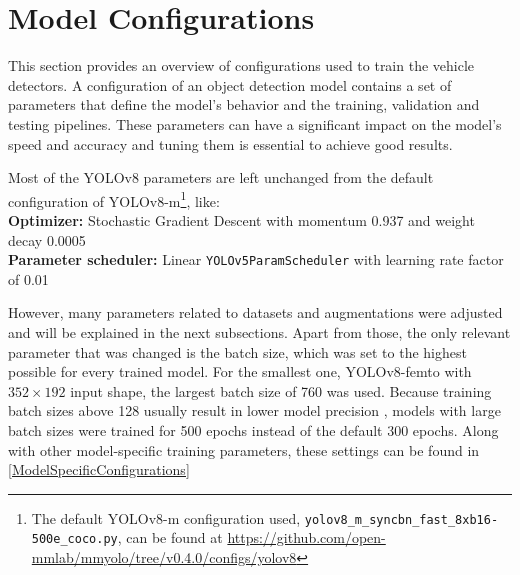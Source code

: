 \section{Model Configurations}


This section provides an overview of configurations used to train the vehicle
detectors. A configuration of an object detection model contains a
set of parameters that define the model's behavior and the training, validation
and testing pipelines. These parameters can have a significant impact on the
model's speed and accuracy and tuning them is essential to achieve good results.

Most of the YOLOv8 parameters are left unchanged from the default configuration
of YOLOv8-m\footnote{The default YOLOv8-m configuration used,
\texttt{yolov8\_m\_syncbn\_fast\_8xb16-500e\_coco.py}, can be found at
\url{https://github.com/open-mmlab/mmyolo/tree/v0.4.0/configs/yolov8}}, like: \\
\textbf{Optimizer:} Stochastic Gradient Descent with momentum \num{0.937} and weight decay \num{0.0005} \\
\textbf{Parameter scheduler:} Linear \verb|YOLOv5ParamScheduler| with learning rate factor of 0.01

However, many parameters related to datasets and augmentations were adjusted and
will be explained in the next subsections. Apart from those, the only relevant
parameter that was changed is the batch size, which was set to the highest
possible for every trained model. For the smallest one, YOLOv8-femto with $352
\times 192$ input shape, the largest batch size of 760 was used. Because
training batch sizes above 128 usually result in lower model precision \cite{LargeBatch}, models
with large batch sizes were trained for 500 epochs instead of the default 300
epochs. Along with other model-specific training parameters, these settings can
be found in \autoref{ModelSpecificConfigurations}


